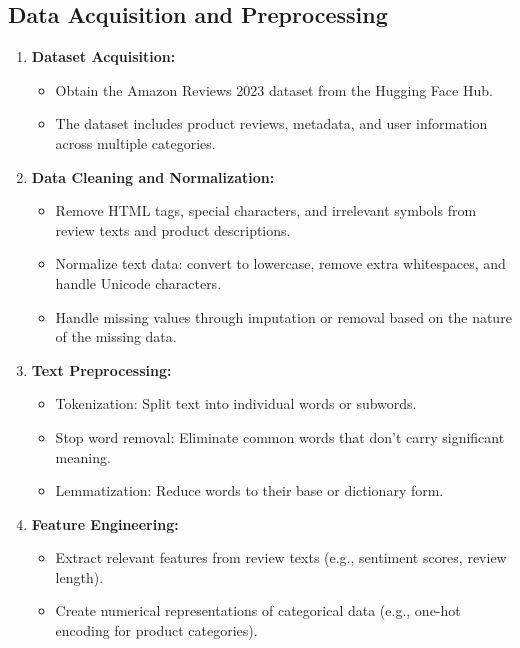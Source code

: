 \documentclass{article}
\begin{document}
\subsection{Data Acquisition and Preprocessing}
\begin{enumerate}
    \item \textbf{Dataset Acquisition:} 
    \begin{itemize}
        \item Obtain the Amazon Reviews 2023 dataset from the Hugging Face Hub.
        \item The dataset includes product reviews, metadata, and user information across multiple categories.
    \end{itemize}
    
    \item \textbf{Data Cleaning and Normalization:}
    \begin{itemize}
        \item Remove HTML tags, special characters, and irrelevant symbols from review texts and product descriptions.
        \item Normalize text data: convert to lowercase, remove extra whitespaces, and handle Unicode characters.
        \item Handle missing values through imputation or removal based on the nature of the missing data.
    \end{itemize}
    
    \item \textbf{Text Preprocessing:}
    \begin{itemize}
        \item Tokenization: Split text into individual words or subwords.
        \item Stop word removal: Eliminate common words that don't carry significant meaning.
        \item Lemmatization: Reduce words to their base or dictionary form.
    \end{itemize}
    
    \item \textbf{Feature Engineering:}
    \begin{itemize}
        \item Extract relevant features from review texts (e.g., sentiment scores, review length).
        \item Create numerical representations of categorical data (e.g., one-hot encoding for product categories).
    \end{itemize}
\end{enumerate}
\end{document}
